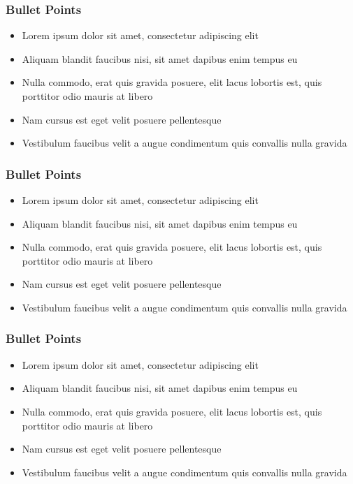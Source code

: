 \begin{frame}
	\frametitle{Bullet Points}
	\begin{itemize}
	\item Lorem ipsum dolor sit amet, consectetur adipiscing elit
	\item Aliquam blandit faucibus nisi, sit amet dapibus enim tempus eu
	\item Nulla commodo, erat quis gravida posuere, elit lacus lobortis est, quis porttitor odio mauris at libero
	\item Nam cursus est eget velit posuere pellentesque
	\item Vestibulum faucibus velit a augue condimentum quis convallis nulla gravida
	\end{itemize}
\end{frame}
% 
% 
% 
% 
\begin{frame}
	\frametitle{Bullet Points}
	\begin{itemize}
	\item Lorem ipsum dolor sit amet, consectetur adipiscing elit
	\item Aliquam blandit faucibus nisi, sit amet dapibus enim tempus eu
	\item Nulla commodo, erat quis gravida posuere, elit lacus lobortis est, quis porttitor odio mauris at libero
	\item Nam cursus est eget velit posuere pellentesque
	\item Vestibulum faucibus velit a augue condimentum quis convallis nulla gravida
	\end{itemize}
\end{frame}
% 
% 
\begin{frame}
	\frametitle{Bullet Points}
	\begin{itemize}
	\item Lorem ipsum dolor sit amet, consectetur adipiscing elit
	\item Aliquam blandit faucibus nisi, sit amet dapibus enim tempus eu
	\item Nulla commodo, erat quis gravida posuere, elit lacus lobortis est, quis porttitor odio mauris at libero
	\item Nam cursus est eget velit posuere pellentesque
	\item Vestibulum faucibus velit a augue condimentum quis convallis nulla gravida
	\end{itemize}
\end{frame}

